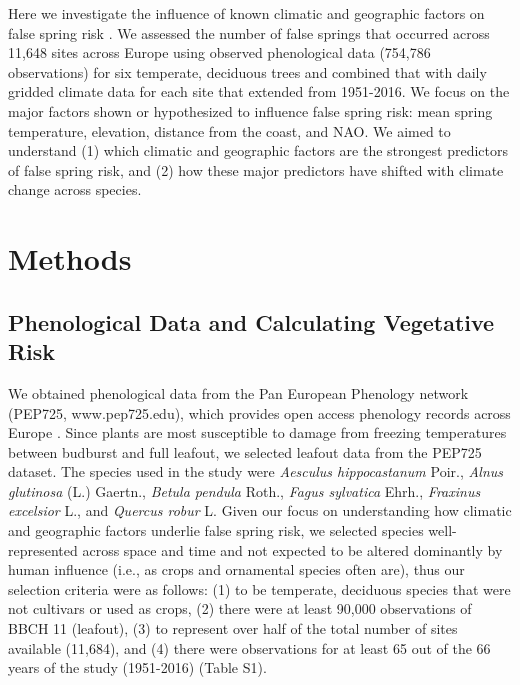 \documentclass{article}\usepackage[]{graphicx}\usepackage[]{color}
\begin{document}
Here we investigate the influence of known climatic and geographic factors on false spring risk \citep[defined here as when temperatures fell below -2.2$^{\circ}$ between estimated budburst and leafout][]{Schwartz1993}. We assessed the number of false springs that occurred across 11,648 sites across Europe using observed phenological data (754,786 observations) for six temperate, deciduous trees and combined that with daily gridded climate data for each site that extended from 1951-2016. We focus on the major factors shown or hypothesized to influence false spring risk: mean spring temperature, elevation, distance from the coast, and NAO. We aimed to understand (1) which climatic and geographic factors are the strongest predictors of false spring risk, and (2) how these major predictors have shifted with climate change across species. 

\section*{Methods} 
\subsection*{Phenological Data and Calculating Vegetative Risk}
We obtained phenological data from the Pan European Phenology network (PEP725, www.pep725.edu), which provides open access phenology records across Europe \citep{Templ2018}. Since plants are most susceptible to damage from freezing temperatures between budburst and full leafout, we selected leafout data \citep[i.e., in][BBCH 11, which is defined as the point of leaf unfolding and the first visible leaf stalk]{Meier2001} from the PEP725 dataset. The species used in the study were \textit{Aesculus hippocastanum} Poir., \textit{Alnus glutinosa} (L.) Gaertn., \textit{Betula pendula} Roth., \textit{Fagus sylvatica} Ehrh., \textit{Fraxinus excelsior} L., and \textit{Quercus robur} L. Given our focus on understanding how climatic and geographic factors underlie false spring risk, we selected species well-represented across space and time and not expected to be altered dominantly by human influence (i.e., as crops and ornamental species often are), thus our selection criteria were as follows: (1) to be temperate, deciduous species that were not cultivars or used as crops, (2) there were at least 90,000 observations of BBCH 11 (leafout), (3) to represent over half of the total number of sites available (11,684), and (4) there were observations for at least 65 out of the 66 years of the study (1951-2016) (Table S1). 
\end{document}
